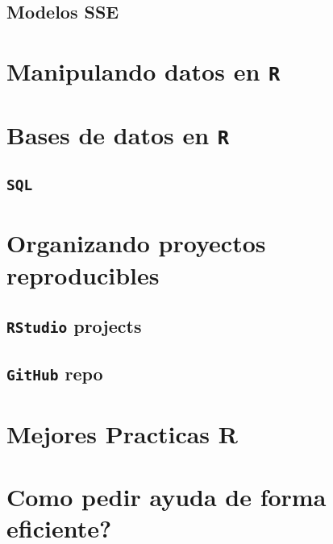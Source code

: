 \documentclass[
]{book}
\begin{document}
\hypertarget{modelos-sse-1}{%
\section{Modelos SSE}\label{modelos-sse-1}}

\hypertarget{manipulando-datos-en-r}{%
\chapter{\texorpdfstring{Manipulando datos en \texttt{R}}{Manipulando datos en R}}\label{manipulando-datos-en-r}}

\hypertarget{bases-de-datos-en-r}{%
\chapter{\texorpdfstring{Bases de datos en \texttt{R}}{Bases de datos en R}}\label{bases-de-datos-en-r}}

\hypertarget{sql}{%
\section{\texorpdfstring{\texttt{SQL}}{SQL}}\label{sql}}

\hypertarget{organizando-proyectos-reproducibles}{%
\chapter{Organizando proyectos reproducibles}\label{organizando-proyectos-reproducibles}}

\hypertarget{rstudio-projects}{%
\section{\texorpdfstring{\texttt{RStudio} projects}{RStudio projects}}\label{rstudio-projects}}

\hypertarget{github-repo}{%
\section{\texorpdfstring{\texttt{GitHub} repo}{GitHub repo}}\label{github-repo}}

\hypertarget{mejores-practicas-r}{%
\chapter{Mejores Practicas R}\label{mejores-practicas-r}}

\hypertarget{como-pedir-ayuda-de-forma-eficiente}{%
\chapter{Como pedir ayuda de forma eficiente?}\label{como-pedir-ayuda-de-forma-eficiente}}
\end{document}
